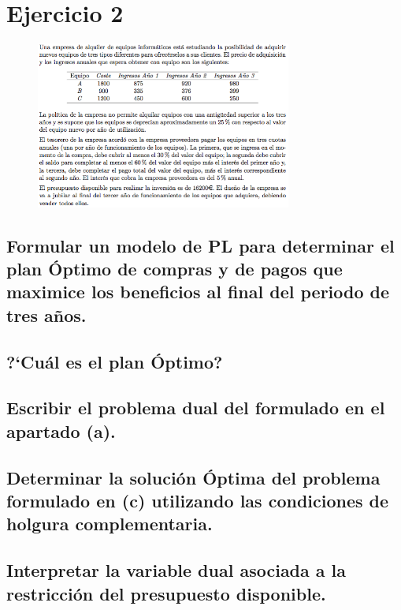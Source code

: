 \documentclass[10pt, a4paper]{article}
\begin{document}
    \section{Ejercicio 2}

        \begin{figure}[H]
        \centering
            \includegraphics[width=0.75\textwidth]{res/Exercise_2.png}
        \end{figure}

		\subsection{Formular un modelo de PL para determinar el plan Óptimo de compras y de pagos que maximice los beneficios al final del periodo de tres años.}

			\paragraph{}


		\subsection{?`Cuál es el plan Óptimo?}

			\paragraph{}


		\subsection{Escribir el problema dual del formulado en el apartado (a).}

			\paragraph{}


		\subsection{Determinar la solución Óptima del problema formulado en (c) utilizando las condiciones de holgura complementaria.}

			\paragraph{}


		\subsection{Interpretar la variable dual asociada a la restricción del presupuesto disponible.}

			\paragraph{}
\end{document}

